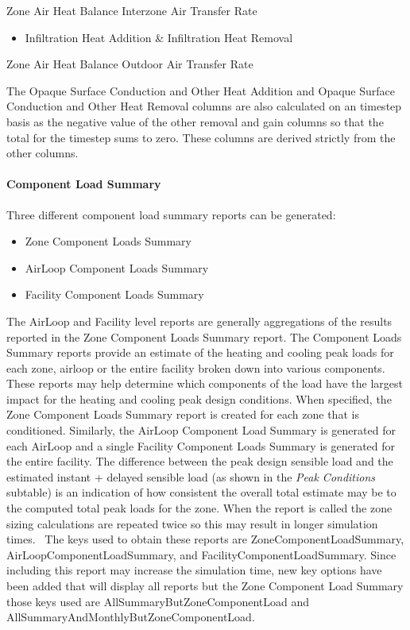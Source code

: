 Zone Air Heat Balance Interzone Air Transfer Rate

\begin{itemize}
\tightlist
\item
  Infiltration Heat Addition \& Infiltration Heat Removal
\end{itemize}

Zone Air Heat Balance Outdoor Air Transfer Rate

The Opaque Surface Conduction and Other Heat Addition and Opaque Surface Conduction and Other Heat Removal columns are also calculated on an timestep basis as the negative value of the other removal and gain columns so that the total for the timestep sums to zero. These columns are derived strictly from the other columns.

\paragraph{Component Load Summary}\label{component-load-summary}

Three different component load summary reports can be generated:

\begin{itemize}
\tightlist
\item
  Zone Component Loads Summary
\item
  AirLoop Component Loads Summary
\item
  Facility Component Loads Summary
\end{itemize}

The AirLoop and Facility level reports are generally aggregations of the results reported in the Zone Component Loads Summary report. The Component Loads Summary reports provide an estimate of the heating and cooling peak loads for each zone, airloop or the entire facility broken down into various components. These reports may help determine which components of the load have the largest impact for the heating and cooling peak design conditions. When specified, the Zone Component Loads Summary report is created for each zone that is conditioned. Similarly, the AirLoop Component Load Summary is generated for each AirLoop and a single Facility Component Loads Summary is generated for the entire facility. The difference between the peak design sensible load and the estimated instant + delayed sensible load (as shown in the \emph{Peak Conditions} subtable) is an indication of how consistent the overall total estimate may be to the computed total peak loads for the zone. When the report is called the zone sizing calculations are repeated twice so this may result in longer simulation times.~ The keys used to obtain these reports are ZoneComponentLoadSummary, AirLoopComponentLoadSummary, and FacilityComponentLoadSummary. Since including this report may increase the simulation time, new key options have been added that will display all reports but the Zone Component Load Summary those keys used are AllSummaryButZoneComponentLoad and AllSummaryAndMonthlyButZoneComponentLoad.

